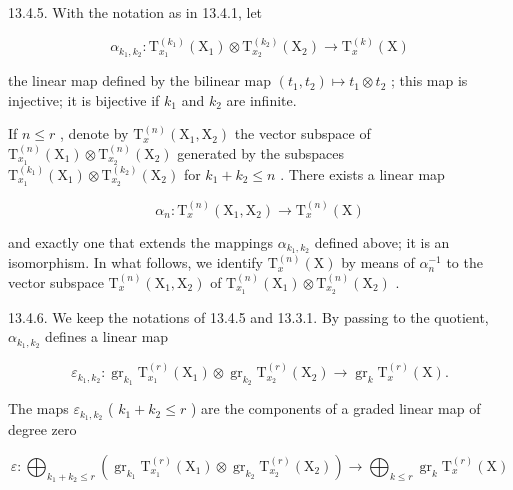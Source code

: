 13.4.5. With the notation as in 13.4.1, let

\[
\alpha_ {k _ {1}, k _ {2}} \colon \mathrm{T} _ {x _ {1}} ^ {(k _ {1})} (\mathrm{X} _ {1}) \otimes \mathrm{T} _ {x _ {2}} ^ {(k _ {2})} (\mathrm{X} _ {2}) \rightarrow \mathrm{T} _ {x} ^ {(k)} (\mathrm{X})
\]

the linear map defined by the bilinear map \((t_{1}, t_{2}) \mapsto t_{1} \otimes t_{2}\) ; this map is injective; it is bijective if \(k_{1}\) and \(k_{2}\) are infinite.

If \(n \leqslant r\) , denote by \(\mathrm{T}_{x}^{(n)}(\mathrm{X}_{1}, \mathrm{X}_{2})\) the vector subspace of \(\mathrm{T}_{x_{1}}^{(n)}(\mathrm{X}_{1}) \otimes \mathrm{T}_{x_{2}}^{(n)}(\mathrm{X}_{2})\) generated by the subspaces \(\mathrm{T}_{x_{1}}^{(k_{1})}(\mathrm{X}_{1}) \otimes \mathrm{T}_{x_{2}}^{(k_{2})}(\mathrm{X}_{2})\) for \(k_{1} + k_{2} \leqslant n\) . There exists a linear map

\[
\alpha_ {n} \colon \mathrm{T} _ {x} ^ {(n)} (\mathrm{X} _ {1}, \mathrm{X} _ {2}) \rightarrow \mathrm{T} _ {x} ^ {(n)} (\mathrm{X})
\]

and exactly one that extends the mappings \(\alpha_{k_1,k_2}\) defined above; it is an isomorphism. In what follows, we identify \(\mathrm{T}_x^{(n)}(\mathrm{X})\) by means of \(\alpha_n^{-1}\) to the vector subspace \(\mathrm{T}_x^{(n)}(\mathrm{X}_1,\mathrm{X}_2)\) of \(\mathrm{T}_{x_1}^{(n)}(\mathrm{X}_1)\otimes \mathrm{T}_{x_2}^{(n)}(\mathrm{X}_2)\) .

13.4.6. We keep the notations of 13.4.5 and 13.3.1. By passing to the quotient, \(\alpha_{k_1,k_2}\) defines a linear map

\[
\varepsilon_ {k _ {1}, k _ {2}} \colon \operatorname{gr} _ {k _ {1}} \mathrm{T} _ {x _ {1}} ^ {(r)} (\mathrm{X} _ {1}) \otimes \operatorname{gr} _ {k _ {2}} \mathrm{T} _ {x _ {2}} ^ {(r)} (\mathrm{X} _ {2}) \rightarrow \operatorname{gr} _ {k} \mathrm{T} _ {x} ^ {(r)} (\mathrm{X}).
\]

The maps \(\varepsilon_{k_1,k_2}\) ( \(k_1 + k_2 \leqslant r\) ) are the components of a graded linear map of degree zero

\[
\varepsilon : \bigoplus_ {k _ {1} + k _ {2} \leqslant r} \left(\operatorname{gr} _ {k _ {1}} \mathrm{T} _ {x _ {1}} ^ {(r)} (\mathrm{X} _ {1}) \otimes \operatorname{gr} _ {k _ {2}} \mathrm{T} _ {x _ {2}} ^ {(r)} (\mathrm{X} _ {2})\right)\rightarrow \bigoplus_ {k \leqslant r} \operatorname{gr} _ {k} \mathrm{T} _ {x} ^ {(r)} (\mathrm{X})
\]

